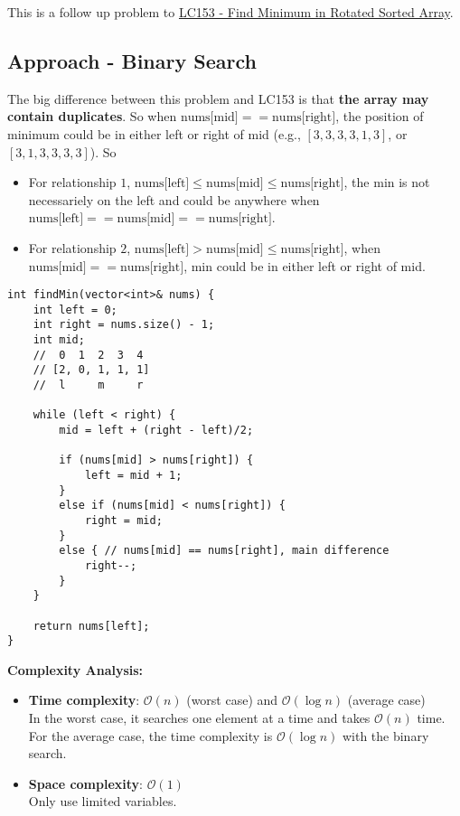 \documentclass[justified]{tufte-book}
\begin{document}
This is a follow up problem to \hyperref[sec:lc153_find_min_rotated_sorted_array]{LC153 - Find Minimum in Rotated Sorted Array}.

\subsection{Approach - Binary Search}
The big difference between this problem and LC153 is that \textbf{the array may contain duplicates}. So when $\text{nums[mid]} == \text{nums[right]}$, the position of minimum could be in either left or right of mid (e.g., $[3, 3, 3, 3, 1, 3]$, or $[3, 1, 3, 3, 3, 3]$). So
\begin{itemize}
    \item For relationship $1$, $\text{nums[left]} \leq \text{nums[mid]} \leq \text{nums[right]}$, the min is not necessariely on the left and could be anywhere when $\text{nums[left]} == \text{nums[mid]} == \text{nums[right]}$.
    \item For relationship $2$, $\text{nums[left]} > \text{nums[mid]} \leq \text{nums[right]}$, when $\text{nums[mid]} == \text{nums[right]}$, min could be in either left or right of mid.
\end{itemize}

\begin{lstlisting}
int findMin(vector<int>& nums) {
    int left = 0;
    int right = nums.size() - 1;
    int mid; 
    //  0  1  2  3  4
    // [2, 0, 1, 1, 1]
    //  l     m     r
    
    while (left < right) {
        mid = left + (right - left)/2;
        
        if (nums[mid] > nums[right]) {
            left = mid + 1;
        }
        else if (nums[mid] < nums[right]) {
            right = mid;
        }
        else { // nums[mid] == nums[right], main difference
            right--;
        }
    }
    
    return nums[left];
}
\end{lstlisting}
\noindent \textbf{Complexity Analysis:}
\begin{itemize}
    \item \textbf{Time complexity}: $\mathcal{O}(n)$ (worst case) and $\mathcal{O}(\log n)$ (average case) \\
    In the worst case, it searches one element at a time and takes $\mathcal{O}(n)$ time. For the average case, the time complexity is $\mathcal{O}(\log n)$ with the binary search.
    \item \textbf{Space complexity}: $\mathcal{O}(1)$ \\
    Only use limited variables.
\end{itemize}
\end{document}
